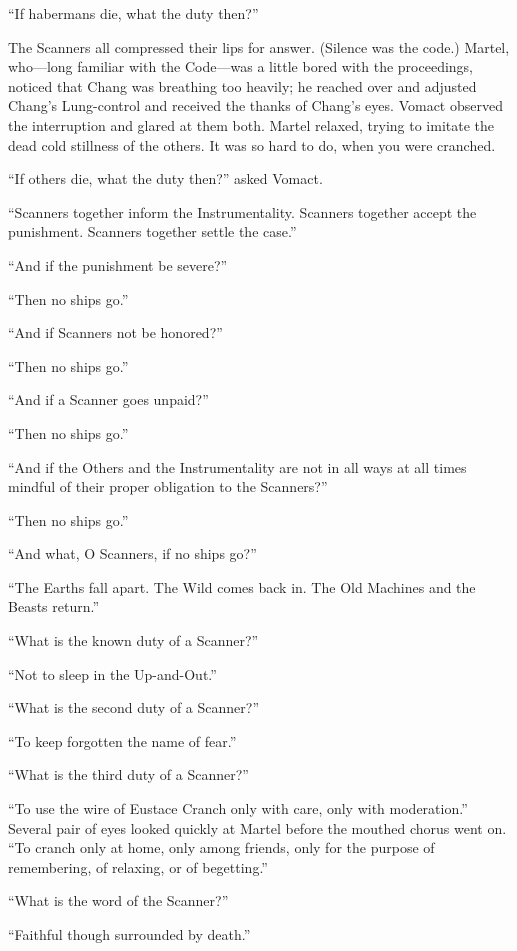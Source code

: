 ``If habermans die, what the duty then?''

The Scanners all compressed their lips for answer. (Silence was the code.) Martel, who---long familiar with the Code---was a little bored with the proceedings, noticed that Chang was breathing too heavily; he reached over and adjusted Chang's Lung-control and received the thanks of Chang's eyes. Vomact observed the interruption and glared at them both. Martel relaxed, trying to imitate the dead cold stillness of the others. It was so hard to do, when you were cranched.

``If others die, what the duty then?'' asked Vomact.

``Scanners together inform the Instrumentality. Scanners together accept the punishment. Scanners together settle the case.''

``And if the punishment be severe?''

``Then no ships go.''

``And if Scanners not be honored?''

``Then no ships go.''

``And if a Scanner goes unpaid?''

``Then no ships go.''

``And if the Others and the Instrumentality are not in all ways at all times mindful of their proper obligation to the Scanners?''

``Then no ships go.''

``And what, O Scanners, if no ships go?''

``The Earths fall apart. The Wild comes back in. The Old Machines and the Beasts return.''

``What is the known duty of a Scanner?''

``Not to sleep in the Up-and-Out.''

``What is the second duty of a Scanner?''

``To keep forgotten the name of fear.''

``What is the third duty of a Scanner?''

``To use the wire of Eustace Cranch only with care, only with moderation.'' Several pair of eyes looked quickly at Martel before the mouthed chorus went on. ``To cranch only at home, only among friends, only for the purpose of remembering, of relaxing, or of begetting.''

``What is the word of the Scanner?''

``Faithful though surrounded by death.''


